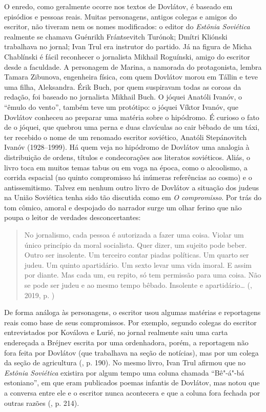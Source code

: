 O enredo, como geralmente ocorre nos textos de Dovlátov, é baseado em
episódios e pessoas reais. Muitas personagens, antigos colegas e amigos
do escritor, não tiveram nem os nomes modificados: o editor do
\emph{Estônia Soviética} realmente se chamava Guénrikh Frántsevitch
Turónok; Dmítri Kliónski trabalhava no jornal; Ivan Trul era instrutor
do partido. Já na figura de Micha Chablínski é fácil reconhecer o
jornalista Mikhail Roguínski, amigo do escritor desde a faculdade. A
personagem de Marina, a namorada do protagonista, lembra Tamara
Zibunova, engenheira física, com quem Dovlátov morou em Tállin e teve
uma filha, Aleksandra. Érik Buch, por quem suspiravam todas as coroas da
redação, foi baseado no jornalista Mikhail Buch. O jóquei Anatóli
Ivanóv, o ``êmulo do vento'', também teve um protótipo: o jóquei Víktor
Ivanóv, que Dovlátov conheceu ao preparar uma matéria sobre o hipódromo.
É curioso o fato de o jóquei, que quebrou uma perna e duas clavículas ao
cair bêbado de um táxi, ter recebido o nome de um renomado escritor
soviético, Anatóli Stepánovitch Ivanóv (1928--1999). Há quem veja no
hipódromo de Dovlátov uma analogia à distribuição de ordens, títulos e
condecorações aos literatos soviéticos. Aliás, o livro toca em muitos
temas tabus ou em voga na época, como o alcoolismo, a corrida espacial (no quinto
compromisso há inúmeras referências ao cosmo) e o antissemitismo. Talvez
em nenhum outro livro de Dovlátov a situação dos judeus na União
Soviética tenha sido tão discutida como em \emph{O compromisso}. Por trás
do tom cômico, amoral e despojado do narrador surge um olhar ferino que
não poupa o leitor de verdades desconcertantes:

\begin{quotation}
No jornalismo, cada pessoa é autorizada a fazer uma coisa. Violar um
único princípio da moral socialista. Quer dizer, um sujeito pode beber.
Outro ser insolente. Um terceiro contar piadas políticas. Um quarto ser
judeu. Um quinto apartidário. Um sexto levar uma vida imoral. E assim
por diante. Mas cada um, eu repito, só tem permissão para uma coisa. Não
se pode ser judeu e ao mesmo tempo bêbado. Insolente e apartidário\ldots{}
{}(, 2019, p. \pageref{ref2})
\end{quotation}

De forma análoga às personagens, o escritor usou algumas matérias e
reportagens reais como base de seus compromissos. Por exemplo, segundo
colegas do escritor entrevistados por Koválova e Lurié, no jornal
realmente saiu uma carta endereçada a Bréjnev escrita por uma
ordenhadora, porém, a reportagem não fora feita por Dovlátov (que
trabalhava na seção de notícias), mas por um colega da seção de
agricultura (, p. 190). No mesmo livro, Ivan Trul afirmou que no
\emph{Estônia Soviética} existira por algum tempo uma coluna chamada
``Bê"-á"-bá estoniano'', em que eram publicados poemas infantis de
Dovlátov, mas notou que a conversa entre ele e o escritor nunca
acontecera e que a coluna fora fechada por outras razões (, p.
214).

